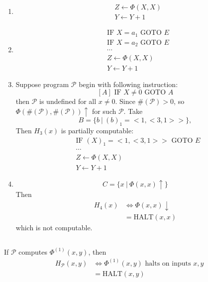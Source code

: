 \subsection{}
\begin{enumerate}
  \item
  \begin{align*}
    & Z \gets \Phi(X,X) \\
    & Y \gets Y + 1
  \end{align*}

  \item
  \begin{align*}
    & \text{IF } X = a_{1} \text{ GOTO } E \\
    & \text{IF } X = a_{2} \text{ GOTO } E \\
    & \cdots \\
    & Z \gets \Phi(X,X) \\
    & Y \gets Y + 1
  \end{align*}

  \item
  Suppose program $\mathscr{P}$ begin with following instruction:
  \[ [A] \text{ IF } X \neq 0 \text{ GOTO } A \]
  then $\mathscr{P}$ is undefined for all $ x \neq 0 $. Since
  $ \#(\mathscr{P}) > 0 $, so $ \Phi(\#(\mathscr{P}), \#(\mathscr{P}))\uparrow $
  for such $\mathscr{P}$. Take
  \[ B = \{b \ |\ (b)_1 = <1,<3,1>> \} ,\]
  Then $ H_3(x) $ is partially computable:
  \begin{align*}
    & \text{IF } (X)_1 = <1,<3,1>> \text{ GOTO } E \\
    & \cdots \\
    & Z \gets \Phi(X,X) \\
    & Y \gets Y + 1
  \end{align*}

  \item
  \[ C = \{ x\ |\ \Phi(x,x)\uparrow \} \]
  Then
  \[ \begin{split}
    H_4(x) & \Leftrightarrow \Phi(x,x)\downarrow \\
           & = \mathrm{HALT}(x,x)
  \end{split} \]
  which is not computable.
\end{enumerate}


\subsection{}
If $\mathscr{P}$ computes $\Phi^{(1)}(x,y) $, then
\[\begin{split}
  H_{\mathscr{P}}(x,y) & \Leftrightarrow \Phi^{(1)}(x,y) \text{ halts on inputs } x,y \\
                       & = \mathrm{HALT}(x,y)
\end{split}\]


